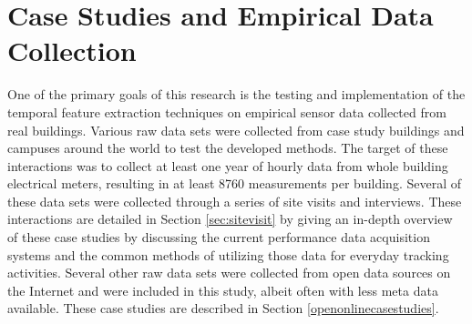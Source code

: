 \section{Case Studies and Empirical Data Collection}
\label{sec:casestudies}

One of the primary goals of this research is the testing and implementation of the temporal feature extraction techniques on empirical sensor data collected from real buildings. Various raw data sets were collected from case study buildings and campuses around the world to test the developed methods. The target of these interactions was to collect at least one year of hourly data from whole building electrical meters, resulting in at least 8760 measurements per building. Several of these data sets were collected through a series of site visits and interviews. These interactions are detailed in Section \ref{sec:sitevisit} by giving an in-depth overview of these case studies by discussing the current performance data acquisition systems and the common methods of utilizing those data for everyday tracking activities. Several other raw data sets were collected from open data sources on the Internet and were included in this study, albeit often with less meta data available. These case studies are described in Section \ref{openonlinecasestudies}. 